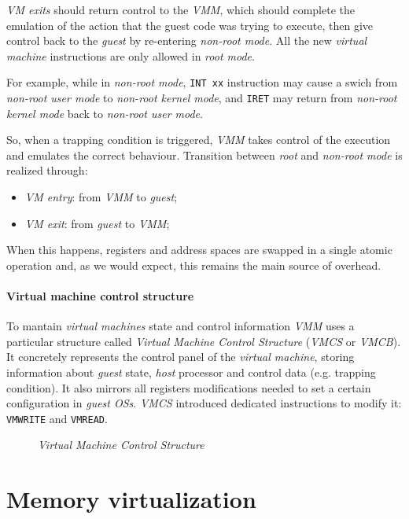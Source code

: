 \emph{VM exits} should return control to the \emph{VMM}, which should complete
the emulation of the action that the guest code was trying to execute, then
give control back to the \emph{guest} by re-entering \emph{non-root mode}. All
the new \emph{virtual machine} instructions are only allowed in \emph{root mode}.

For example, while in \emph{non-root mode}, \texttt{INT xx} instruction may cause
a swich from \emph{non-root user mode} to \emph{non-root kernel mode}, and
\texttt{IRET} may return from \emph{non-root kernel mode} back to \emph{non-root
user mode}.

\bigskip\noindent
So, when a trapping condition is triggered, \emph{VMM} takes control of the
execution and emulates the correct behaviour. Transition between \emph{root}
and \emph{non-root mode} is realized through:
\begin{itemize}
    \item\emph{VM entry}: from \emph{VMM} to \emph{guest};
    \item\emph{VM exit}: from \emph{guest} to \emph{VMM};
\end{itemize}\noindent
When this happens, registers and address spaces are swapped in a single atomic
operation and, as we would expect, this remains the main source of overhead.

\paragraph{Virtual machine control structure}
To mantain \emph{virtual machines} state and control information \emph{VMM}
uses a particular structure called \emph{Virtual Machine Control Structure}
(\emph{VMCS} or \emph{VMCB}). It concretely represents the control panel of
the \emph{virtual machine}, storing information about \emph{guest} state,
\emph{host} processor and control data (e.g. trapping condition). It also
mirrors all registers modifications needed to set a certain configuration in
\emph{guest OSs}. \emph{VMCS} introduced dedicated instructions to modify it:
\texttt{VMWRITE} and \texttt{VMREAD}.

\begin{figure}[h!]
    \centering
    \caption{\emph{Virtual Machine Control Structure}}
\end{figure}

\section{Memory virtualization}
